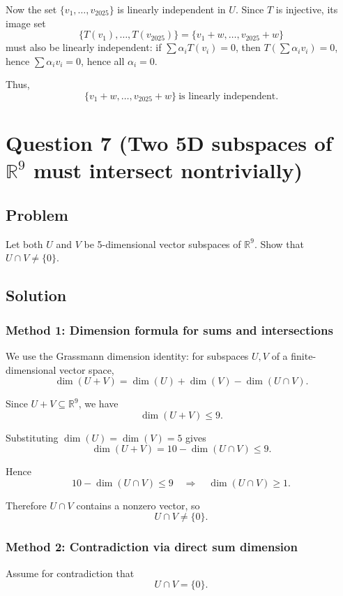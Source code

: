 \documentclass[12pt]{article}
\newcommand{\R}{\mathbb{R}}
\newcommand{\dimn}{\operatorname{dim}}
\begin{document}
Now the set \(\{v_1,\ldots,v_{2025}\}\) is linearly independent in \(U\).
Since \(T\) is injective, its image set
\[
\{T(v_1),\ldots,T(v_{2025})\}=\{v_1+w,\ldots,v_{2025}+w\}
\]
must also be linearly independent: if \(\sum \alpha_i T(v_i)=0\), then \(T(\sum \alpha_i v_i)=0\), hence \(\sum \alpha_i v_i=0\), hence all \(\alpha_i=0\).

Thus,
\[
\boxed{\,\{v_1+w,\ldots,v_{2025}+w\}\ \text{is linearly independent.}\,}
\]

\newpage
\section{Question 7 (Two 5D subspaces of \(\R^9\) must intersect nontrivially)}
\subsection{Problem}
Let both \(U\) and \(V\) be 5-dimensional vector subspaces of \(\R^9\).
Show that \(U\cap V\neq \{0\}\).

\subsection{Solution}

\subsubsection{Method 1: Dimension formula for sums and intersections}
We use the Grassmann dimension identity: for subspaces \(U,V\) of a finite-dimensional vector space,
\[
\dimn(U+V)=\dimn(U)+\dimn(V)-\dimn(U\cap V).
\]

Since \(U+V\subseteq \R^9\), we have
\[
\dimn(U+V)\le 9.
\]

Substituting \(\dimn(U)=\dimn(V)=5\) gives
\[
\dimn(U+V)=10-\dimn(U\cap V)\le 9.
\]

Hence
\[
10-\dimn(U\cap V)\le 9
\quad\Longrightarrow\quad
\dimn(U\cap V)\ge 1.
\]

Therefore \(U\cap V\) contains a nonzero vector, so
\[
\boxed{U\cap V\neq \{0\}.}
\]

\subsubsection{Method 2: Contradiction via direct sum dimension}
Assume for contradiction that
\[
U\cap V=\{0\}.
\]
\end{document}
